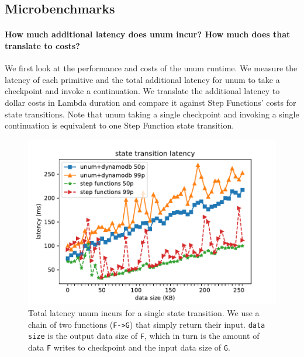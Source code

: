 \subsection{Microbenchmarks}


\paragraph{How much additional latency does unum incur? How much does that
translate to costs?}

We first look at the performance and costs of the unum runtime. We measure the
latency of each primitive and the total additional latency for unum to take a
checkpoint and invoke a continuation. We translate the additional latency to
dollar costs in Lambda duration and compare it against Step Functions' costs
for state transitions. Note that unum taking a single checkpoint and invoking
a single continuation is equivalent to one Step Function state transition.

\begin{figure}[t!]
    \centering
    \includegraphics[width=\columnwidth]{figures/TotalAdditionalLatency.pdf}
    \caption{Total latency unum incurs for a single state transition. We use a
    chain of two functions (\texttt{F->G}) that simply return their input.
    \texttt{data size} is the output data size of \texttt{F}, which in turn is
    the amount of data \texttt{F} writes to checkpoint and the input data size
    of \texttt{G}.}
        \label{fig:totallatency}
\end{figure}

